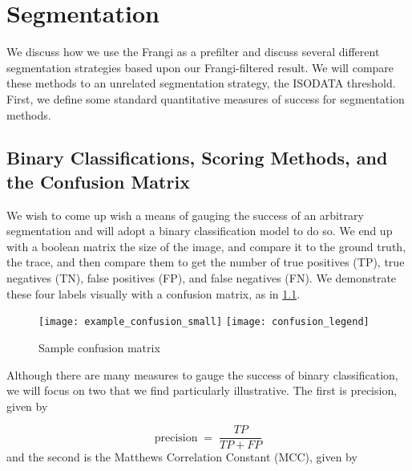 \chapter{Segmentation} \label{ch:segmentation}

We discuss how we use the Frangi as a prefilter and discuss several different segmentation strategies based upon our Frangi-filtered result. We will compare these methods to an unrelated segmentation strategy, the ISODATA threshold. First, we define some standard quantitative measures of success for segmentation methods.


\section{Binary Classifications, Scoring Methods, and the Confusion Matrix}

We wish to come up wish a means of gauging the success of an arbitrary segmentation and will adopt a binary classification model to do so.
We end up with a boolean matrix the size of the image, and compare it to the ground truth, the trace, and then compare them to get the number of true positives (TP), true negatives (TN), false positives (FP), and false negatives (FN). We demonstrate these four labels visually with a confusion matrix, as in \cref{fig:sample-confusion}.
 
\begin{figure}
  \centering
  \texttt{[image: example\_confusion\_small]}
  \texttt{[image: confusion\_legend]}
  \caption{Sample confusion matrix}
  \label{fig:sample-confusion}
\end{figure}

Although there are many measures to gauge the success of binary classification, we will focus on two that we find particularly illustrative. The first is precision, given by

\begin{equation}
\label{eq:precision}
\textrm{precision} \;=\; \frac{TP}{TP+FP}
\end{equation}
\noindent and the second is the Matthews Correlation Constant (MCC), given by

